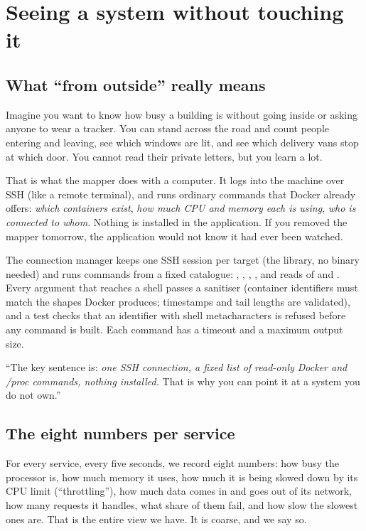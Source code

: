 \chapter{Seeing a system without touching it}
\label{ch:observe}

\section{What ``from outside'' really means}
\begin{simplebox}
Imagine you want to know how busy a building is without going inside or asking anyone to wear a tracker. You can stand across the road and count people entering and leaving, see which windows are lit, and see which delivery vans stop at which door. You cannot read their private letters, but you learn a lot.

That is what the mapper does with a computer. It logs into the machine over SSH (like a remote terminal), and runs ordinary commands that Docker already offers: \emph{which containers exist}, \emph{how much CPU and memory each is using}, \emph{who is connected to whom}. Nothing is installed in the application. If you removed the mapper tomorrow, the application would not know it had ever been watched.
\end{simplebox}

\begin{techbox}
The connection manager keeps one SSH session per target (the  library, no  binary needed) and runs commands from a fixed catalogue: , , , , and reads of  and . Every argument that reaches a shell passes a sanitiser (container identifiers must match the shapes Docker produces; timestamps and tail lengths are validated), and a test checks that an identifier with shell metacharacters is refused before any command is built. Each command has a timeout and a maximum output size.
\end{techbox}

\begin{saybox}
``The key sentence is: \emph{one SSH connection, a fixed list of read-only Docker and /proc commands, nothing installed.} That is why you can point it at a system you do not own.''
\end{saybox}

\section{The eight numbers per service}
\begin{simplebox}
For every service, every five seconds, we record eight numbers: how busy the processor is, how much memory it uses, how much it is being slowed down by its CPU limit (``throttling''), how much data comes in and goes out of its network, how many requests it handles, what share of them fail, and how slow the slowest ones are. That is the entire view we have. It is coarse, and we say so.
\end{simplebox}

